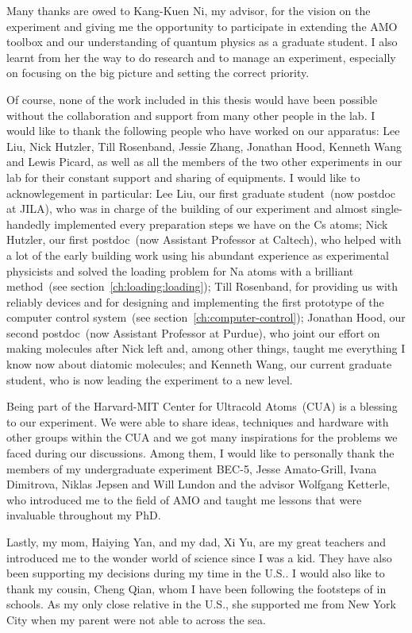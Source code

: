 
Many thanks are owed to Kang-Kuen Ni, my advisor,
for the vision on the experiment and giving me the opportunity
to participate in extending the AMO toolbox and our understanding of quantum physics
as a graduate student.
I also learnt from her the way to do research and to manage an experiment,
especially on focusing on the big picture and setting the correct priority.

Of course, none of the work included in this thesis would have been possible
without the collaboration and support from many other people in the lab.
I would like to thank the following people who have worked on our apparatus:
Lee Liu, Nick Hutzler, Till Rosenband, Jessie Zhang,
Jonathan Hood, Kenneth Wang and Lewis Picard,
as well as all the members of the two other experiments in our lab
for their constant support and sharing of equipments.
I would like to acknowlegement in particular:
Lee Liu, our first graduate student~(now postdoc at JILA),
who was in charge of the building of our experiment and almost single-handedly implemented
every preparation steps we have on the Cs atoms;
Nick Hutzler, our first postdoc~(now Assistant Professor at Caltech),
who helped with a lot of the early building work using his abundant experience
as experimental physicists and solved the loading problem for Na atoms
with a brilliant method~(see section~\ref{ch:loading:loading});
Till Rosenband, for providing us with reliably devices
and for designing and implementing the first prototype
of the computer control system~(see section~\ref{ch:computer-control});
Jonathan Hood, our second postdoc~(now Assistant Professor at Purdue),
who joint our effort on making molecules after Nick left and, among other things,
taught me everything I know now about diatomic molecules;
and Kenneth Wang, our current graduate student,
who is now leading the experiment to a new level.

Being part of the Harvard-MIT Center for Ultracold Atoms~(CUA) is a blessing to our experiment.
We were able to share ideas, techniques and hardware with other groups within the CUA
and we got many inspirations for the problems we faced during our discussions.
Among them, I would like to personally thank the members of my undergraduate experiment BEC-5,
Jesse Amato-Grill, Ivana Dimitrova, Niklas Jepsen and Will Lundon
and the advisor Wolfgang Ketterle, who introduced me to the field of AMO
and taught me lessons that were invaluable throughout my PhD.

Lastly, my mom, Haiying Yan, and my dad, Xi Yu, are my great teachers
and introduced me to the wonder world of science since I was a kid.
They have also been supporting my decisions during my time in the U.S..
I would also like to thank my cousin, Cheng Qian,
whom I have been following the footsteps of in schools.
As my only close relative in the U.S., she supported me from New York City
when my parent were not able to across the sea.
